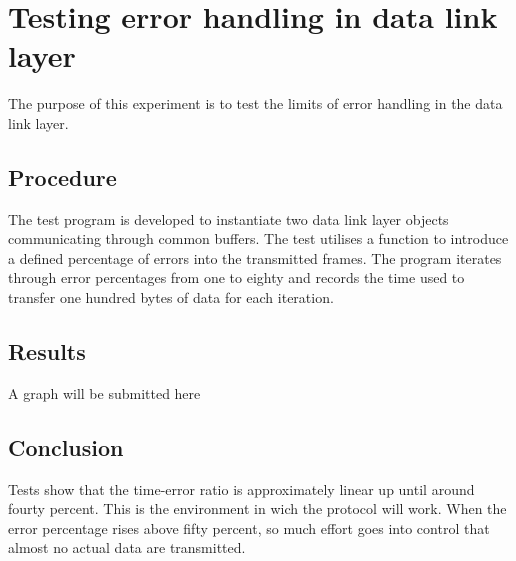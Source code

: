 \section{Testing error handling in data link layer}\label{app:exp:dll_result}
The purpose of this experiment is to test the limits of error handling in the
data link layer.

\subsection{Procedure}
The test program  is developed to instantiate two data
link layer objects communicating through common buffers. The test utilises a
function  to introduce a defined percentage of errors
into the transmitted frames. The program iterates through error percentages from
one to eighty and records the time used to transfer one hundred bytes of data
for each iteration.

\subsection{Results}
A graph will be submitted here

\subsection{Conclusion}
Tests show that the time-error ratio is approximately linear up until around
fourty percent. This is the environment in wich the protocol will work. When the
error percentage rises above fifty percent, so much effort goes into control
that almost no actual data are transmitted.
